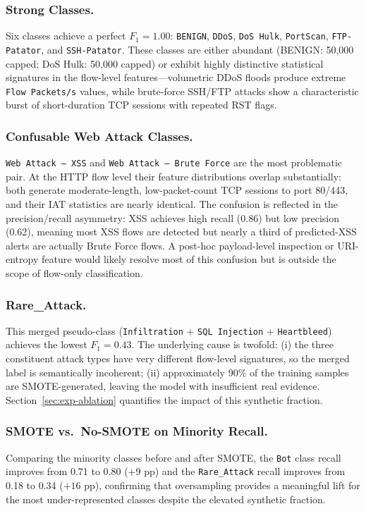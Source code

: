 \subsubsection*{Strong Classes.}
Six classes achieve a perfect $F_1 = 1.00$: \texttt{BENIGN}, \texttt{DDoS}, \texttt{DoS Hulk}, \texttt{PortScan}, \texttt{FTP-Patator}, and \texttt{SSH-Patator}. These classes are either abundant (BENIGN: 50,000 capped; DoS Hulk: 50,000 capped) or exhibit highly distinctive statistical signatures in the flow-level features---volumetric DDoS floods produce extreme \texttt{Flow Packets/s} values, while brute-force SSH/FTP attacks show a characteristic burst of short-duration TCP sessions with repeated RST flags.

\subsubsection*{Confusable Web Attack Classes.}
\texttt{Web Attack -- XSS} and \texttt{Web Attack -- Brute Force} are the most problematic pair. At the HTTP flow level their feature distributions overlap substantially: both generate moderate-length, low-packet-count TCP sessions to port 80/443, and their IAT statistics are nearly identical. The confusion is reflected in the precision/recall asymmetry: XSS achieves high recall (0.86) but low precision (0.62), meaning most XSS flows are detected but nearly a third of predicted-XSS alerts are actually Brute Force flows. A post-hoc payload-level inspection or URI-entropy feature would likely resolve most of this confusion but is outside the scope of flow-only classification.

\subsubsection*{Rare\_Attack.}
This merged pseudo-class (\texttt{Infiltration} + \texttt{SQL Injection} + \texttt{Heartbleed}) achieves the lowest $F_1 = 0.43$. The underlying cause is twofold: (i) the three constituent attack types have very different flow-level signatures, so the merged label is semantically incoherent; (ii) approximately 90\% of the training samples are SMOTE-generated, leaving the model with insufficient real evidence. Section~\ref{sec:exp-ablation} quantifies the impact of this synthetic fraction.

\subsubsection*{SMOTE vs.\ No-SMOTE on Minority Recall.}
Comparing the minority classes before and after SMOTE, the \texttt{Bot} class recall improves from 0.71 to 0.80 ($+9$ pp) and the \texttt{Rare\_Attack} recall improves from 0.18 to 0.34 ($+16$ pp), confirming that oversampling provides a meaningful lift for the most under-represented classes despite the elevated synthetic fraction.

